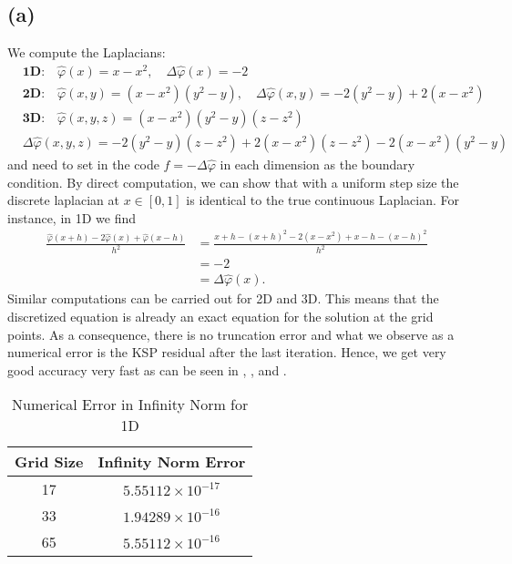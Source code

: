  \subsection*{(a)}
 \FloatBarrier
 We compute the Laplacians:
\begin{align*}
& \textbf{1D:} \quad \hat{\varphi}(x) = x - x^2, \quad \Delta \hat{\varphi}(x) = -2\\
& \textbf{2D:} \quad \hat{\varphi}(x, y) = (x - x^2)(y^2 - y), \quad
\Delta \hat{\varphi}(x, y) = -2(y^2 - y) + 2(x - x^2) \\
& \textbf{3D:} \quad \hat{\varphi}(x, y, z) = (x - x^2)(y^2 - y)(z - z^2)\\
& \Delta \hat{\varphi}(x, y, z) = -2(y^2 - y)(z - z^2) + 2(x - x^2)(z - z^2) - 2(x - x^2)(y^2 - y)
\end{align*}
and need to set in the code $f = -\Delta \hat\varphi$ in each dimension as the boundary condition. By direct computation, we can show that with a uniform step size the discrete laplacian at $x \in [0, 1]$ is identical to the true continuous Laplacian. For instance, in 1D we find
\begin{align*}
\frac{\hat\varphi(x + h) - 2\hat\varphi(x) + \hat\varphi(x - h)}{h^2} & = \frac{x + h - (x + h)^2 -2(x - x^2) + x - h - (x - h)^2}{h^2} \\
& = -2 \\
& = \Delta \hat\varphi(x).
\end{align*}
Similar computations can be carried out for 2D and 3D. This means that the discretized equation is already an exact equation for the solution at the grid points. As a consequence, there is no truncation error and what we observe as a numerical error is the KSP residual after the last iteration. Hence, we get very good accuracy very fast as can be seen in , , and .

\begin{table}[h!]
\centering
\begin{tabular}{|c|c|}
\hline
\textbf{Grid Size} & \textbf{Infinity Norm Error} \\
\hline
17 & $5.55112 \times 10^{-17}$ \\
\hline
33 & $1.94289 \times 10^{-16}$ \\
\hline
65 & $5.55112 \times 10^{-16}$ \\
\hline
\end{tabular}
\caption{Numerical Error in Infinity Norm for 1D}
\label{1D_err}
\end{table}

